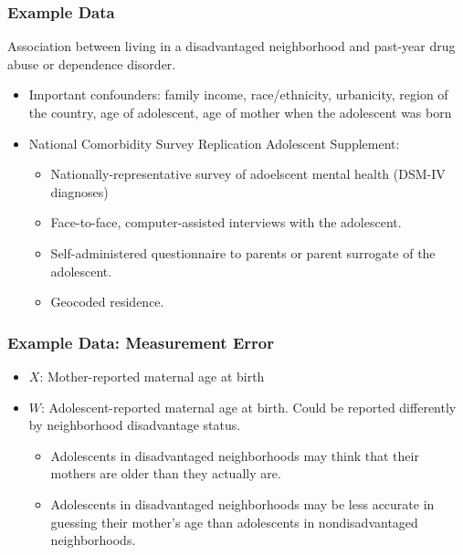 \documentclass{beamer}
\begin{document}
\begin{frame}

\frametitle{ Example Data}



Association between living in a disadvantaged neighborhood and past-year drug abuse or dependence disorder.

\begin{itemize}

\item Important confounders: family income, race/ethnicity, urbanicity, region of the country, age of adolescent, age of mother when the adolescent was born

\item National Comorbidity Survey Replication Adolescent Supplement: 
\begin{itemize}
	\item Nationally-representative survey of adoelscent mental health (DSM-IV diagnoses)
	\item Face-to-face, computer-assisted interviews with the adolescent. 
  	\item Self-administered questionnaire to parents or parent surrogate of the adolescent.
  	\item Geocoded residence.
\end{itemize}
\end{itemize}

\end{frame} 

\begin{frame}


\frametitle{ Example Data: Measurement Error}

\begin{itemize}

\item $X$: Mother-reported maternal age at birth 

\item $W$: Adolescent-reported maternal age at birth. Could be reported differently by neighborhood disadvantage status.
\begin{itemize}
	\item Adolescents in disadvantaged neighborhoods may think that their mothers are older than they actually are.
	\item Adolescents in disadvantaged neighborhoods may be less accurate in guessing their mother's age than adolescents in nondisadvantaged neighborhoods.
\end{itemize}
 \end{itemize}

\end{frame} 
\end{document}
